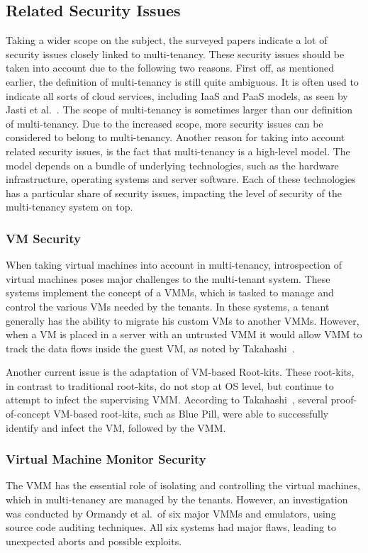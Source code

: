 \subsection{Related Security Issues}
Taking a wider scope on the subject, the surveyed papers indicate a lot of security issues closely linked to multi-tenancy. 
These security issues should be taken into account due to the following two reasons.
First off, as mentioned earlier, the definition of multi-tenancy is still quite ambiguous. 
It is often used to indicate all sorts of cloud services, including \ac{IaaS} and \ac{PaaS} models, as seen by Jasti et al.~\cite{Jasti2010Security}. 
The scope of multi-tenancy is sometimes larger than our definition of multi-tenancy. Due to the increased scope, more security issues can be considered to belong to multi-tenancy.
Another reason for taking into account related security issues, is the fact that multi-tenancy is a high-level model. 
The model depends on a bundle of underlying technologies, such as the hardware infrastructure, operating systems and server software. 
Each of these technologies has a particular share of security issues, impacting the level of security of the multi-tenancy system on top. \\


\subsubsection{\acf{VM} Security}
When taking virtual machines into account in multi-tenancy, introspection of virtual machines poses major challenges to the multi-tenant system. 
These systems implement the concept of a \acp{VMM}, which is tasked to manage and control the various \acp{VM} needed by the tenants.
In these systems, a tenant generally has the ability to migrate his custom \acp{VM} to another \acp{VMM}. 
However, when a \ac{VM} is placed in a server with an untrusted \ac{VMM} it would allow \ac{VMM} to track the data flows inside the guest VM, as noted by Takahashi~\cite{Takahashi2012Security}.

Another current issue is the adaptation of VM-based Root-kits. 
These root-kits, in contrast to traditional root-kits, do not stop at OS level, but continue to attempt to infect the supervising \ac{VMM}. 
According to Takahashi~\cite{Takahashi2012Security}, several proof-of-concept VM-based root-kits, such as Blue Pill, were able to successfully identify and infect the VM, followed by the \ac{VMM}.

\subsubsection{Virtual Machine Monitor Security}
The \acl{VMM} has the essential role of isolating and controlling the virtual machines, which in multi-tenancy are managed by the tenants.
However, an investigation was conducted by Ormandy et al.~\cite{Ormandy2007Security}of six major \acp{VMM} and emulators, using source code auditing techniques. All six systems had major flaws, leading to unexpected aborts and possible exploits.


